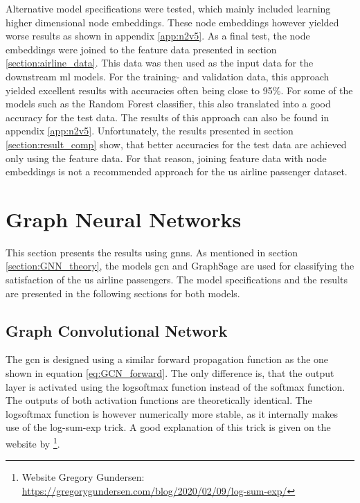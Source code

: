  \noindent Alternative model specifications were tested, which mainly included
  learning higher dimensional node embeddings. These node embeddings however
  yielded worse results as shown in appendix \ref{app:n2v5}. As a final test, 
  the node embeddings were joined to the feature data presented in section 
  \ref{section:airline_data}. This data was then used as the input data for the 
  downstream \acs{ml} models. For the training- and validation data, this 
  approach yielded excellent results with accuracies often being close to 95\%. 
  For some of the models such as the Random Forest classifier, this also
  translated into a good accuracy for the test data. The results of this
  approach can also be found in appendix \ref{app:n2v5}. Unfortunately, the 
  results presented in section \ref{section:result_comp} show, that better 
  accuracies for the test data are achieved only using the feature data. For 
  that reason, joining feature data with node embeddings is not a recommended 
  approach for the \acs{us} airline passenger dataset.

  \section{Graph Neural Networks}

  This section presents the results using \acsp{gnn}. As mentioned in section 
  \ref{section:GNN_theory}, the models \acs{gcn} \citep{kipf2016semi} and 
  GraphSage \citep{hamilton2017inductive} are used for classifying the 
  satisfaction of the \acs{us} airline passengers. The model specifications and
  the results are presented in the following sections for both models.

  \subsection{Graph Convolutional Network}
  \label{section:GCN_results}

  The \acs{gcn} is designed using a similar forward propagation function as the
  one shown in equation \ref{eq:GCN_forward}. The only difference is, that
  the output layer is activated using the logsoftmax function instead of the
  softmax function. The outputs of both activation functions are theoretically 
  identical. The logsoftmax function is however numerically more stable, as it 
  internally makes use of the log-sum-exp trick. A good explanation of this
  trick is given on the website by \cite{gundersen2020}\footnote{Website 
  Gregory Gundersen: \\\url{https://gregorygundersen.com/blog/2020/02/09/log-sum-exp/}}.

